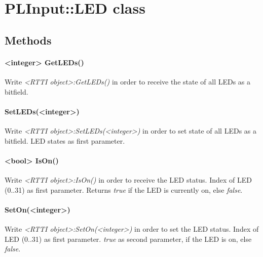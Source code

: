 \section{PLInput::LED class}


\subsection{Methods}

\paragraph{<integer> GetLEDs()}
Write \emph{<RTTI object>:GetLEDs()} in order to receive the state of all LEDs as a bitfield.

\paragraph{SetLEDs(<integer>)}
Write \emph{<RTTI object>:SetLEDs(<integer>)} in order to set state of all LEDs as a bitfield. LED states as first parameter.

\paragraph{<bool> IsOn()}
Write \emph{<RTTI object>:IsOn()} in order to receive the LED status. Index of LED (0..31) as first parameter. Returns \emph{true} if the LED is currently on, else \emph{false}.

\paragraph{SetOn(<integer>)}
Write \emph{<RTTI object>:SetOn(<integer>)} in order to set the LED status. Index of LED (0..31) as first parameter. \emph{true} as second parameter, if the LED is on, else \emph{false}.
